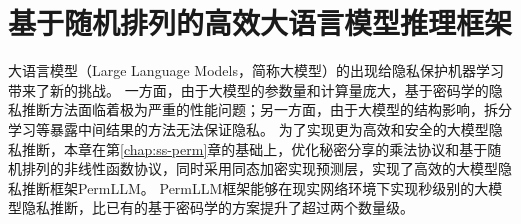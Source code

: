 \chapter{基于随机排列的高效大语言模型推理框架}
大语言模型（Large Language Models，简称大模型）的出现给隐私保护机器学习带来了新的挑战。
%
一方面，由于大模型的参数量和计算量庞大，基于密码学的隐私推断方法面临着极为严重的性能问题；另一方面，由于大模型的结构影响，拆分学习等暴露中间结果的方法无法保证隐私。
%
为了实现更为高效和安全的大模型隐私推断，本章在第\ref{chap:ss-perm}章的基础上，优化秘密分享的乘法协议和基于随机排列的非线性函数协议，同时采用同态加密实现预测层，实现了高效的大模型隐私推断框架PermLLM。
%
PermLLM框架能够在现实网络环境下实现秒级别的大模型隐私推断，比已有的基于密码学的方案提升了超过两个数量级。






